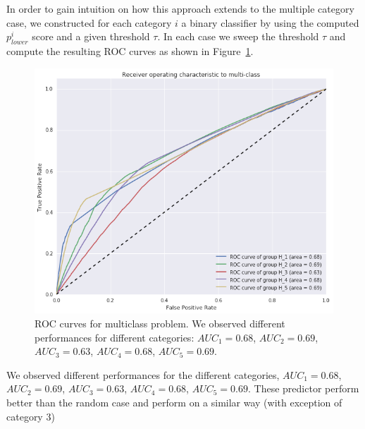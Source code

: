 In order to gain intuition on how this approach extends to the multiple category case, we constructed for each category $i$ a binary classifier by using the computed $p^i_{lower}$ score and a given threshold $\tau$. In each case we sweep the threshold $\tau$ and compute the resulting ROC curves as shown in Figure~\ref{roc_multiple_categories}.

\begin{figure}
\centering
\includegraphics[width=0.8\columnwidth]{figures/ROC_multiclass/ROC_multiclass.png}
\caption{ROC curves for multiclass problem. We observed different performances for  different categories: $AUC_1 = 0.68$, $AUC_2 = 0.69$, $AUC_3 = 0.63$, $AUC_4 = 0.68$, $AUC_5 = 0.69$.}
\label{roc_multiple_categories}
\end{figure}

We observed different performances for the different categories, $AUC_1 = 0.68$, $AUC_2 = 0.69$, $AUC_3=0.63$, $AUC_4 = 0.68$, $AUC_5 = 0.69$. These predictor perform better than the random case and perform on a similar way (with exception of category 3)


